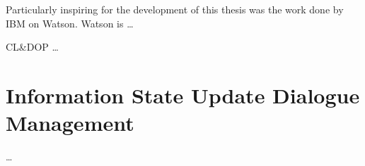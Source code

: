 Particularly inspiring for the development of this thesis was the work done by IBM on Watson. Watson is \ldots 

CL\&DOP \ldots


\section{Information State Update Dialogue Management}

\ldots
